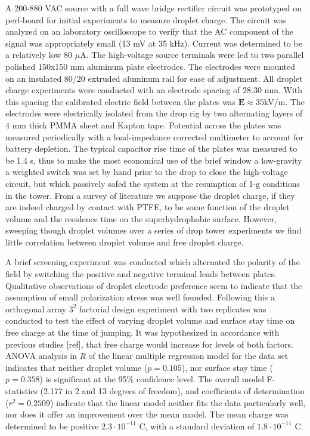 \documentclass[12pt,a4paper,oneside]{book}
\begin{document}
A 200-880 VAC source with a full wave bridge rectifier circuit was prototyped on perf-board for initial experiments to measure droplet charge. The circuit was analyzed on an laboratory oscilloscope to verify that the AC component of the signal was appropriately small (13 mV at 35 kHz). Current was determined to be a relatively low 80 $\mu$A. The high-voltage source terminals were led to two parallel polished 150x150 mm aluminum plate electrodes. The electrodes were mounted on an insulated 80/20 extruded aluminum rail for ease of adjustment. All droplet charge experiments were conducted with an electrode spacing of 28.30 mm. With this spacing the calibrated electric field between the plates was $\mathbf{E} \approx 35$kV/m. The electrodes were electrically isolated from the drop rig by two alternating layers of 4 mm thick PMMA sheet and Kapton tape. Potential across the plates was measured periodically with a load-impedance corrected multimeter to account for battery depletion. The typical capacitor rise time of the plates was measured to be 1.4 s, thus to make the most economical use of the brief window a low-gravity a weighted switch was set by hand prior to the drop to close the high-voltage circuit, but which passively safed the system at the resumption of 1-g conditions in the tower. From a survey of literature we suppose the droplet charge, if they are indeed charged by contact with PTFE, to be some function of the droplet volume and the residence time on the superhydrophobic surface. However, sweeping though droplet volumes over a series of drop tower experiments we find little correlation between droplet volume  and free droplet charge.

A brief screening experiment was conducted which alternated the polarity of the field by switching the positive and negative terminal leads between plates. Qualitative observations of droplet electrode preference seem to indicate that the assumption of small polarization stress was well founded. Following this a orthogonal array $3^2$ factorial design experiment with two replicates was conducted to test the effect of varying droplet volume and surface stay time on free charge at the time of jumping. It was hypothesized in accordance with previous studies [ref], that free charge would increase for levels of both factors. ANOVA analysis in \emph{R} of the linear multiple regression model for the data set indicates that neither droplet volume ($p=0.105$), nor surface stay time ($p=0.358$) is significant at the 95\% confidence level. The overall model F-statistics (2.177 in 2 and 13 degrees of freedom), and coefficients of determination ($r^2 = 0.2509$) indicate that the linear model neither fits the data particularly well, nor does it offer an improvement over the mean model. The mean charge was determined to be positive $2.3 \cdot 10^{-11}$ C, with a standard deviation of $1.8 \cdot 10^{-11}$ C.

\backmatter
\printbibliography
\end{document}
